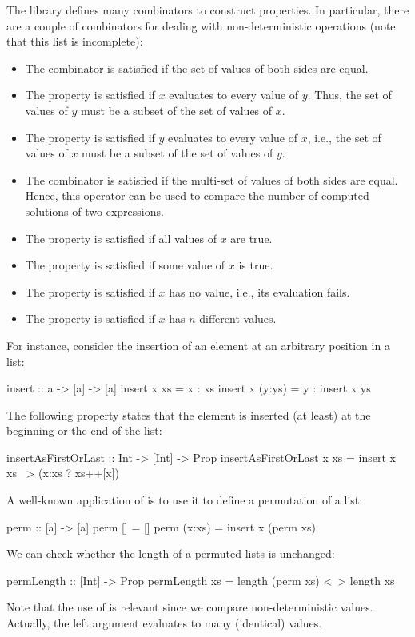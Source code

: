 The library  defines many combinators
to construct properties. In particular, there are a couple of
combinators for dealing with non-deterministic operations
(note that this list is incomplete):
\begin{itemize}
\item
The combinator  is satisfied if the set of values
of both sides are equal.
\item
The property  is satisfied if $x$
evaluates to every value of $y$.
Thus, the set of values of $y$ must be a subset of the set of values of $x$.
\item
The property  is satisfied if $y$
evaluates to every value of $x$, i.e.,
the set of values of $x$ must be a subset of the set of values of $y$.
\item
The combinator  is satisfied
if the multi-set of values of both sides are equal.
Hence, this operator can be used to compare the number
of computed solutions of two expressions.
\item
The property  is satisfied if all values of $x$ are true.
\item
The property  is satisfied if some value
of $x$ is true.
\item
The property  is satisfied if $x$ has no value,
i.e., its evaluation fails.
\item
The property  is satisfied if $x$ has $n$
different values.
\end{itemize}
%
For instance, consider the insertion of an element at an arbitrary
position in a list:
\begin{curry}
insert :: a -> [a] -> [a]
insert x xs     = x : xs
insert x (y:ys) = y : insert x ys
\end{curry}
The following property states that the element is inserted
(at least) at the beginning or the end of the list:
\begin{curry}
insertAsFirstOrLast :: Int -> [Int] -> Prop
insertAsFirstOrLast x xs = insert x xs ~> (x:xs ? xs++[x])
\end{curry}
%
A well-known application of  is to use it to define
a permutation of a list:
\begin{curry}
perm :: [a] -> [a]
perm []     = []
perm (x:xs) = insert x (perm xs)
\end{curry}
We can check whether the length of a permuted lists is unchanged:
\begin{curry}
permLength :: [Int] -> Prop
permLength xs = length (perm xs) <~> length xs
\end{curry}
Note that the use of  is relevant since
we compare non-deterministic values. Actually, the left argument
evaluates to many (identical) values.

